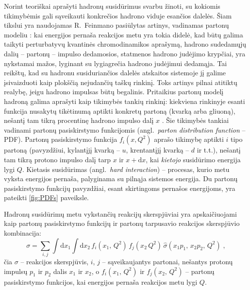 \documentclass[a4paper, 12pt, oneside]{article}
\newlength\q
\begin{document}
Norint teoriškai aprašyti hadronų susidūrimus svarbu žinoti, su kokiomis tikimybėmis gali sąveikauti konkrečios
hadrono viduje esančios dalelės.
Šiam tikslui yra naudojamas R.~Feinmano pasiūlytas artinys, vadinamas partonų modeliu \cite{FeynPartons}:
kai energijos pernaša reakcijos metu yra tokia didelė, kad būtų galima taikyti perturbatyvų kvantinės chromodinamikos aprašymą,
hadrono sudedamųjų dalių -- partonų -- impulso dedamosios, statmenos hadrono judėjimo krypčiai, yra nykstamai mažos,
lyginant su lygiagrečia hadrono judėjimui dedamąja.
Tai reikštų, kad su hadronu susiduriančios dalelės atskaitos sistemoje jį galime įsivaizduoti kaip plokščią nejudančių
taškų rinkinį.
Toks artinys pilnai atitiktų realybę, jeigu hadrono impulsas būtų begalinis.
Pritaikius partonų modelį hadroną galima aprašyti kaip tikimybės tankių rinkinį: kiekviena rinkinyje esanti funkcija nusakytų tikėtinumą
aptikti konkretų partoną (kvarką arba gliuoną), nešantį tam tikrą procentinę hadrono impulso dalį $x$ \cite{BjorkPartons}.
Šie tikimybės tankiai vadinami partonų pasiskirstymo funkcijomis (angl.\ \textit{parton distribution function} -- PDF).
Partonų pasiskirstymo funkcija $f_{i}(x, Q^{2})$ aprašo tikimybę aptikti $i$ tipo partoną (pavyzdžiui, kylantįjį kvarką -- $u$,
krentantįjį kvarką -- $d$ ir t.t.), nešantį tam tikrą protono impulso dalį tarp $x$ ir $x\!+\!\mathrm{d}x$, kai \textit{kietojo}
susidūrimo energija lygi $Q$.
Kietasis susidūrimas (angl.\ \textit{hard interaction}) -- procesas, kurio metu vyksta energijos pernaša, palyginama
su pilnąja sistemos energija.
Du partonų pasiskirstymo funkcijų pavyzdžiai, esant skirtingoms pernašos energijoms, yra pateikti
\ref{fig:PDFs} paveiksle.

Hadronų susidūrimų metu vykstančių reakcijų skerspjūviai yra apskaičiuojami kaip partonų pasiskirstymo
funkcijų ir partonų tarpusavio reakcijos skerspjūvio kombinacija:
\begin{equation}
	\sigma = \sum_{i, j} \int \mathrm{d}x_1 \int \mathrm{d}x_2 \,
	f_{i}(x_1, \, Q^2) \, f_{j}(x_2 \, Q^2) \, \hat{\sigma}(x_1 p_1, \, x_2 p_2, \, Q^2) \; \mathrm{,}
	\label{eq:PDFxsec}
\end{equation}
čia $\sigma$ -- reakcijos skerspjūvis, $i$, $j$ -- sąveikaujantys partonai, nešantys protonų impulsų $p_1$ ir $p_2$
dalis $x_1$ ir $x_2$, o $f_{i}(x_1, \, Q^2)$ ir $f_{j}(x_2, \, Q^2)$ -- partonų pasiskirstymo funkcijos, kai
energijos pernaša reakcijos metu lygi $Q$.
\end{document}

